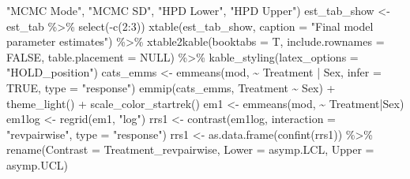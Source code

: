 \documentclass[12pt]{article}
\newenvironment{Shaded}{\begin{snugshade}}{\end{snugshade}}
\newcommand{\AttributeTok}[1]{\textcolor[rgb]{0.77,0.63,0.00}{#1}}
\newcommand{\ConstantTok}[1]{\textcolor[rgb]{0.00,0.00,0.00}{#1}}
\newcommand{\DecValTok}[1]{\textcolor[rgb]{0.00,0.00,0.81}{#1}}
\newcommand{\FunctionTok}[1]{\textcolor[rgb]{0.00,0.00,0.00}{#1}}
\newcommand{\NormalTok}[1]{#1}
\newcommand{\OtherTok}[1]{\textcolor[rgb]{0.56,0.35,0.01}{#1}}
\newcommand{\SpecialCharTok}[1]{\textcolor[rgb]{0.00,0.00,0.00}{#1}}
\newcommand{\StringTok}[1]{\textcolor[rgb]{0.31,0.60,0.02}{#1}}
\begin{document}
\begin{Shaded}
\begin{Highlighting}[]
                       \StringTok{"MCMC Mode"}\NormalTok{, }\StringTok{"MCMC SD"}\NormalTok{, }\StringTok{"HPD Lower"}\NormalTok{, }\StringTok{"HPD Upper"}\NormalTok{)}
\NormalTok{est\_tab\_show }\OtherTok{\textless{}{-}}\NormalTok{ est\_tab }\SpecialCharTok{\%\textgreater{}\%} \FunctionTok{select}\NormalTok{(}\SpecialCharTok{{-}}\FunctionTok{c}\NormalTok{(}\DecValTok{2}\SpecialCharTok{:}\DecValTok{3}\NormalTok{))}
\FunctionTok{xtable}\NormalTok{(est\_tab\_show, }\AttributeTok{caption =} \StringTok{"Final model parameter estimates"}\NormalTok{) }\SpecialCharTok{\%\textgreater{}\%}
  \FunctionTok{xtable2kable}\NormalTok{(}\AttributeTok{booktabs =}\NormalTok{ T, }\AttributeTok{include.rownames =} \ConstantTok{FALSE}\NormalTok{, }\AttributeTok{table.placement =} \ConstantTok{NULL}\NormalTok{) }\SpecialCharTok{\%\textgreater{}\%}
  \FunctionTok{kable\_styling}\NormalTok{(}\AttributeTok{latex\_options =} \StringTok{"HOLD\_position"}\NormalTok{) }
\NormalTok{cats\_emms }\OtherTok{\textless{}{-}} \FunctionTok{emmeans}\NormalTok{(mod, }\SpecialCharTok{\textasciitilde{}}\NormalTok{ Treatment }\SpecialCharTok{|}\NormalTok{ Sex, }\AttributeTok{infer =} \ConstantTok{TRUE}\NormalTok{, }\AttributeTok{type =} \StringTok{"response"}\NormalTok{)}
\FunctionTok{emmip}\NormalTok{(cats\_emms, Treatment }\SpecialCharTok{\textasciitilde{}}\NormalTok{ Sex) }\SpecialCharTok{+} 
  \FunctionTok{theme\_light}\NormalTok{() }\SpecialCharTok{+} \FunctionTok{scale\_color\_startrek}\NormalTok{()}
\NormalTok{em1 }\OtherTok{\textless{}{-}} \FunctionTok{emmeans}\NormalTok{(mod, }\SpecialCharTok{\textasciitilde{}}\NormalTok{ Treatment}\SpecialCharTok{|}\NormalTok{Sex)}
\NormalTok{em1log }\OtherTok{\textless{}{-}} \FunctionTok{regrid}\NormalTok{(em1, }\StringTok{"log"}\NormalTok{)}
\NormalTok{rrs1 }\OtherTok{\textless{}{-}} \FunctionTok{contrast}\NormalTok{(em1log, }\AttributeTok{interaction =} \StringTok{"revpairwise"}\NormalTok{, }\AttributeTok{type =} \StringTok{"response"}\NormalTok{)}
\NormalTok{rrs1 }\OtherTok{\textless{}{-}} \FunctionTok{as.data.frame}\NormalTok{(}\FunctionTok{confint}\NormalTok{(rrs1)) }\SpecialCharTok{\%\textgreater{}\%}
  \FunctionTok{rename}\NormalTok{(}\AttributeTok{Contrast =}\NormalTok{ Treatment\_revpairwise, }\AttributeTok{Lower =}\NormalTok{ asymp.LCL, }\AttributeTok{Upper =}\NormalTok{ asymp.UCL)}


\end{Highlighting}
\end{Shaded}
\end{document}
